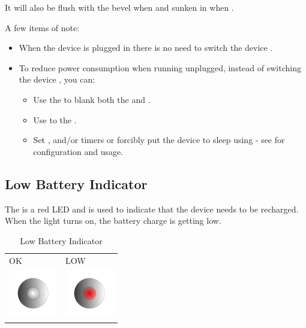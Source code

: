 It will also be flush with the bevel when  and sunken in when .

\par\medskip

A few items of note:

\begin{itemize}
  \item When the device is plugged in there is no need to switch the device
    .
  \item To reduce power consumption when running unplugged, instead of switching
    the device , you can:
    \begin{itemize}
      \item Use the \hyperref[Brightness Knob]{} to blank both the
        \hyperref[Display]{} and \hyperref[Lighting]{}.
      \item Use \hyperref[Play|Pause|Stop]{} to  the
        \hyperref[Audio]{}.
      \item Set ,  and/or  timers or forcibly put the
        device to sleep using  - see \hyperref[Power Settings]{}
        for configuration and usage.
    \end{itemize}
\end{itemize}

\subsection{Low Battery Indicator} \label{Low Battery Indicator}

The  is a red LED and is used to indicate that the device needs to be
recharged.  When the light turns on, the battery charge is getting low.

\begin{table}[H]
\centering
\begin{tabu} to 6cm { X[1,c,m] X[1,c,m] }
  OK & LOW \\
  \includegraphics{images/lowbat_off.png}
    & \includegraphics{images/lowbat_on.png} \\
\end{tabu}
\caption{Low Battery Indicator}
\end{table}

